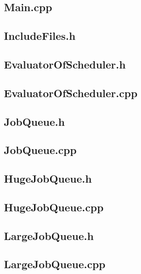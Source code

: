\documentclass [10 pt, a4 paper]{report}
\begin{document}
\subsection{Main.cpp}

\subsection{IncludeFiles.h}


\subsection{EvaluatorOfScheduler.h}

\subsection{EvaluatorOfScheduler.cpp}


\subsection{JobQueue.h}

\subsection{JobQueue.cpp}


\subsection{HugeJobQueue.h}

\subsection{HugeJobQueue.cpp}


\subsection{LargeJobQueue.h}

\subsection{LargeJobQueue.cpp}

\end{document}
